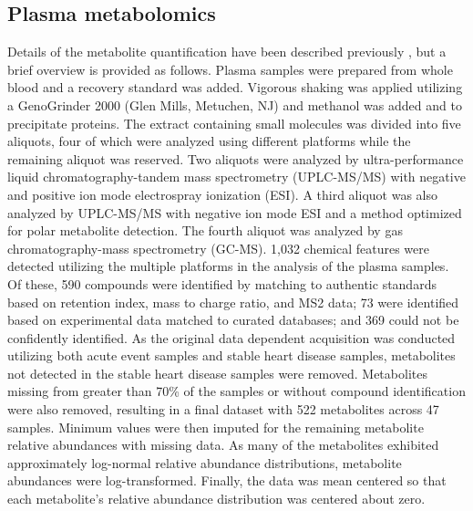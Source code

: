 \begin{DoubleSpace*}
\section{Plasma metabolomics}
\label{plasma}
Details of the metabolite quantification have been described previously \cite{trainor2017}, but a brief overview is provided as follows. Plasma samples were prepared from whole blood and a recovery standard was added. Vigorous shaking was applied utilizing a GenoGrinder 2000 (Glen Mills, Metuchen, NJ) and methanol was added and to precipitate proteins. The extract containing small molecules was divided into five aliquots, four of which were analyzed using different platforms while the remaining aliquot was reserved. Two aliquots were analyzed by ultra-performance liquid chromatography-tandem mass spectrometry (UPLC-MS/MS) with negative and positive ion mode electrospray ionization (ESI). A third aliquot was also analyzed by UPLC-MS/MS with negative ion mode ESI and a method optimized for polar metabolite detection. The fourth aliquot was analyzed by gas chromatography-mass spectrometry (GC-MS). 1,032 chemical features  were detected utilizing the multiple platforms in the analysis of the plasma samples. Of these, 590 compounds were identified by matching to authentic standards based on retention index, mass to charge ratio, and MS2 data; 73 were identified based on experimental data matched to curated databases; and 369 could not be confidently identified. As the original data dependent acquisition was conducted utilizing both acute event samples and stable heart disease samples, metabolites not detected in the stable heart disease samples were removed. Metabolites missing from greater than 70\% of the samples or without compound identification were also removed, resulting in a final dataset with 522 metabolites across 47 samples. Minimum values were then imputed for the remaining metabolite relative abundances with missing data. As many of the metabolites exhibited approximately log-normal relative abundance distributions, metabolite abundances were log-transformed. Finally, the data was mean centered so that each metabolite’s relative abundance distribution was centered about zero. 


\end{DoubleSpace*}

